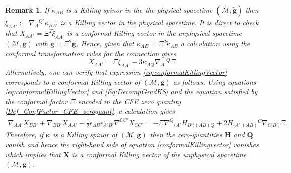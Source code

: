 \documentclass[10pt,a4paper]{article}
\theoremstyle{plain}
\newtheorem{remark}{Remark}
\def\bmg{{\bm g}}
\def\bmH{{\bm H}}
\def\bmQ{{\bm Q}}
\def\bmX{{\bm X}}
\begin{document}
\begin{remark} \emph{
  If $\tilde{\kappa}_{AB}$ is a Killing spinor in the the physical
  spacetime $(\tilde{\mathcal{M}},\tilde{\bmg})$ then
  $\tilde{\xi}_{AA'} := \nabla_A{}^{Q'}\tilde{\kappa}_{BA'}$ is a
  Killing vector in the physical spacetime.  It is direct to check
  that $X_{AA'}=\Xi^2 \tilde{\xi}_{AA'}$ is a conformal Killing vector
  in the unphysical spacetime $(\mathcal{M},\bmg)$ with
  $\bmg=\Xi^2\tilde{\bmg}$.  Hence, given that
  $\kappa_{AB}=\Xi^{2}\tilde{\kappa}_{AB}$ a calculation using the
  conformal transformation rules for the connection gives
\begin{equation}\label{eq:conformalKillingVector}
X_{AA'}=\Xi \xi_{AA'} - 3 \kappa_{AQ}\nabla_{A'}{}^{Q}\Xi
\end{equation}
Alternatively, one can verify that expression \eqref{eq:conformalKillingVector}
corresponds to a conformal Killing vector of $(\mathcal{M},\bmg)$ as follows.
Using equations \eqref{eq:conformalKillingVector} and
\eqref{Eq:DecompGradKS} and the equation satisfied by the conformal
factor $\Xi$ encoded in the CFE zero quantity
\eqref{Def_ConfFactor_CFE_zeroquant}, a calculation gives
\begin{multline}\label{conformalKillingvector}
  \nabla_{AA'}X_{BB'}+\nabla_{BB'}X_{AA'}-\tfrac{1}{2}\epsilon_{AB}\epsilon_{A'B'}\nabla^{CC'}X_{CC'}
  =-\Xi \nabla^Q{}_{(A'}H_{B')(AB)Q} + 2H_{(A'|(AB)}{}^{C}\nabla_{C|B')}\Xi.
\end{multline}
Therefore, if $\bm\kappa$ is a Killing spinor of $(\mathcal{M},\bmg)$ then
the zero-quantities $\bmH$ and $\bmQ$ vanish and hence the right-hand
side of equation \eqref{conformalKillingvector} vanishes which implies
that $\bmX$ is a conformal Killing vector of the unphysical spacetime $(\mathcal{M},\bmg)$.  }
\end{remark}
\end{document}
